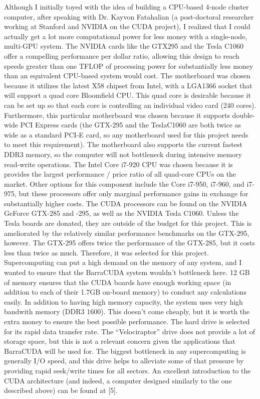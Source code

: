\documentclass[10pt]{article}
\begin{document}
Although I initially toyed with the idea of building a CPU-based 4-node cluster computer, after speaking with Dr. Kayvon Fatahalian (a post-doctoral researcher working at Stanford and NVIDIA on the CUDA project), I realized that I could actually get a lot more computational power for less money with a single-node, multi-GPU system. The NVIDIA cards like the GTX295 and the Tesla C1060 offer a compelling performance per dollar ratio, allowing this design to reach speeds greater than one TFLOP of processing power for substantially less money than an equivalent CPU-based system would cost. The motherboard was chosen because it utilizes the latest X58 chipset from Intel, with a LGA1366 socket that will support a quad core Bloomfield CPU. This quad core is desirable because it can be set up so that each core is controlling an individual video card (240 cores). Furthermore, this particular motherboard was chosen because it supports double-wide PCI Express cards (the GTX-295 and the TeslaC1060 are both twice as wide as a standard PCI-E card, so any motherboard used for this project needs to meet this requirement). The motherboard also supports the current fastest DDR3 memory, so the computer will not bottleneck during intensive memory read-write operations. The Intel Core i7-920 CPU was chosen because it is provides the largest performance / price ratio of all quad-core CPUs on the market. Other options for this component include the Core i7-950, i7-960, and i7-975, but these  processors offer only marginal performance gains in exchange for substantially higher costs. The CUDA processors can be found on the NVIDIA GeForce GTX-285 and -295, as well as the NVIDIA Tesla C1060. Unless the Tesla boards are donated, they are outside of the budget for this project. This is ameliorated by the relatively similar performance benchmarks on the GTX-295, however. The GTX-295 offers twice the performance of the GTX-285, but it costs less than twice as much. Therefore, it was selected for this project. Supercomputing can put a high demand on the memory of any system, and I wanted to ensure that the BarraCUDA system wouldn't bottleneck here. 12 GB of memory ensures that the CUDA boards have enough working space (in addition to each of their 1.7GB on-board memory) to conduct any calculations easily. In addition to having high memory capacity, the system uses very high bandwith memory (DDR3 1600). This doesn't come cheaply, but it is worth the extra money to ensure the best possible performance. The hard drive is selected for its rapid data transfer rate. The ``Velociraptor'' drive does not provide a lot of storage space, but this is not a relevant concern given the applications that BarraCUDA will be used for. The biggest bottleneck in any supercomputing is generally I/O speed, and this drive helps to alleviate some of that pressure by providing rapid seek/write times for all sectors. An excellent introduction to the CUDA architecture (and indeed, a computer designed similarly to the one described above) can be found at [5].
\end{document}
